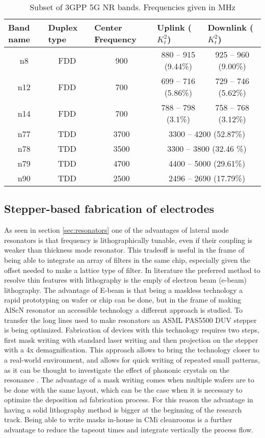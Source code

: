 \begin{table}[]
	\begin{tabular}{@{}ccccc@{}}
		\toprule
		\multicolumn{1}{l}{Band name} & \multicolumn{1}{l}{Duplex type} & \multicolumn{1}{l}{Center Frequency} & \multicolumn{1}{l}{Uplink ($K_t^2$)} & \multicolumn{1}{l}{Downlink ($K_t^2$)} \\ \midrule
		n8 & FDD & 900 & 880 – 915 (9.44\%) & 925 – 960 (9.00\%) \\
		n12 & FDD & 700 & 699 – 716 (5.86\%) & 729 – 746 (5.62\%) \\
		n14 & FDD & 700 & 788 – 798 (3.1\%) & 758 – 768 (3.12\%) \\
		n77 & TDD & 3700 & \multicolumn{2}{c}{3300 – 4200 (52.87\%)} \\
		n78 & TDD & 3500 & \multicolumn{2}{c}{3300 – 3800 (32.46 \%)} \\
		n79 & TDD & 4700 & \multicolumn{2}{c}{4400 – 5000 (29.61\%)} \\
		n90 & TDD & 2500 & \multicolumn{2}{c}{2496 – 2690 (17.79\%)} \\ \bottomrule
	\end{tabular}
	\caption{Subset of 3GPP 5G NR bands. Frequencies given in MHz}
	\label{tab:bands}
\end{table}

\subsection{Stepper-based fabrication of electrodes}
As seen in section \ref{sec:resonators} one of the advantages of lateral mode resonators is that frequency is lithographically tunable, even if their coupling is weaker than thickness mode resonator. This tradeoff is useful in the frame of being able to integrate an array of filters in the same chip, especially given the offset needed to make a lattice type of filter. In literature \cite{schaffer_investigation_2020} \cite{schaffer_super_2020} the preferred method to resolve thin features with lithography is the emply of electron beam (e-beam) lithography. The advantage of E-beam is that being a maskless technology a rapid prototyping on wafer or chip can be done, but in the frame of making AlScN resonator an accessible technology a different approach is studied. To transfer the long lines used to make resonators an ASML PAS5500 DUV stepper is being optimized. Fabrication of devices with this technology requires two steps, first mask writing with standard  
laser writing and then projection on the stepper with a 4x demagnification. This approach allows to bring the technology closer to a real-world environment, and allows for quick writing of repeated small patterns, as it can be thought to investigate the effect of phononic crystals on the resonance \cite{kuo_fractal_2011}. The advantage of a mask writing comes when multiple wafers are to be done with the same layout, which can be the case when it is necessary to optimize the deposition ad fabrication process. For this reason the advantage in having a solid lithography method is bigger at the beginning of the research track. Being able to write masks in-house in CMi cleanrooms is a further advantage to reduce the tapeout times and integrate vertically the process flow. 

